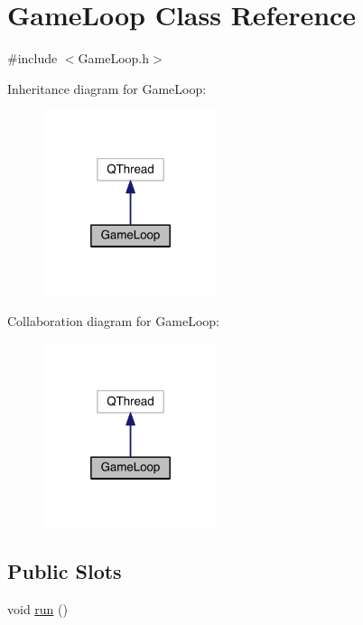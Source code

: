 \hypertarget{class_game_loop}{\section{Game\+Loop Class Reference}
\label{class_game_loop}
}


{\ttfamily \#include $<$Game\+Loop.\+h$>$}



Inheritance diagram for Game\+Loop\+:\nopagebreak
\begin{figure}[H]
\begin{center}
\leavevmode
\includegraphics[width=145pt]{class_game_loop__inherit__graph}
\end{center}
\end{figure}


Collaboration diagram for Game\+Loop\+:\nopagebreak
\begin{figure}[H]
\begin{center}
\leavevmode
\includegraphics[width=145pt]{class_game_loop__coll__graph}
\end{center}
\end{figure}
\subsection*{Public Slots}
\begin{DoxyCompactItemize}
\item 
void \hyperlink{class_game_loop_a819f7585c0841dbad50444dc08312ae1}{run} ()
\end{DoxyCompactItemize}
